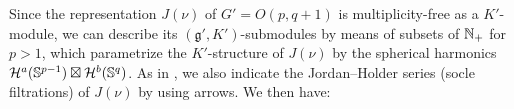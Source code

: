 \documentclass[12pt]{article} %
\theoremstyle{definition}
\theoremstyle{exampstyle} \newtheorem{examp}[theorem]{Theorem}
\begin{document}
	Since the representation $J(\nu)$ of $G'=O(p,q+1)$ is multiplicity-free as a $K'$-module, we can describe its $(\mathfrak{g}',K')$-submodules by means of subsets of $\mathbb{N}_{+}$
	for $p>1$, which parametrize the $K'$-structure of $J(\nu)$ by the spherical harmonics $\mathcal{H}^a(\mathbb{S}^{p-1})\boxtimes\mathcal{H}^b(\mathbb{S}^q)$.
	As in \cite{howe1993homogeneous}, we also indicate the Jordan--Holder series (socle filtrations) of $J(\nu)$ by using arrows.
	We then have:
\end{document}
